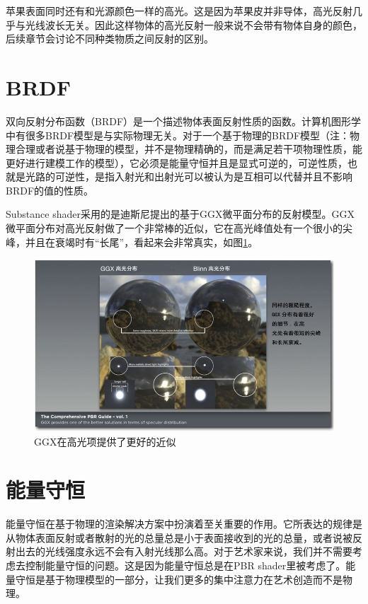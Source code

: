 苹果表面同时还有和光源颜色一样的高光。这是因为苹果皮并非导体，高光反射几乎与光线波长无关。因此这样物体的高光反射一般来说不会带有物体自身的颜色，后续章节会讨论不同种类物质之间反射的区别。

\section{BRDF}

双向反射分布函数（BRDF）是一个描述物体表面反射性质的函数。计算机图形学中有很多BRDF模型是与实际物理无关。对于一个基于物理的BRDF模型（注：物理合理或者说基于物理的模型，并不是物理精确的，而是满足若干项物理性质，能更好进行建模工作的模型），它必须是能量守恒并且是显式可逆的，可逆性质，也就是光路的可逆性，是指入射光和出射光可以被认为是互相可以代替并且不影响BRDF的值的性质。

Substance shader采用的是迪斯尼提出的基于GGX微平面分布的反射模型。GGX微平面分布对高光反射做了一个非常棒的近似，它在高光峰值处有一个很小的尖峰，并且在衰竭时有“长尾”，看起来会非常真实，如图\ref{fig:chap1_8}。

\begin{figure}[ht]
    \centering
	\includegraphics[width=\textwidth]{images/chap1_8.jpg}
	\caption{GGX在高光项提供了更好的近似}
    \label{fig:chap1_8}
\end{figure}

\section{能量守恒}

能量守恒在基于物理的渲染解决方案中扮演着至关重要的作用。它所表达的规律是从物体表面反射或者散射的光的总量总是小于表面接收到的光的总量，或者说被反射出去的光线强度永远不会有入射光线那么高。对于艺术家来说，我们并不需要考虑去控制能量守恒的问题。这是因为能量守恒总是在PBR shader里被考虑了。能量守恒是基于物理模型的一部分，让我们更多的集中注意力在艺术创造而不是物理。

